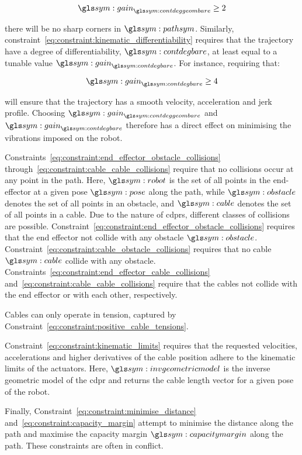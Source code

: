 	\begin{equation}
		\gain_{\contdeggeombare} \geq 2
	\end{equation}

	there will be no sharp corners in $\pathsym$. Similarly,
	constraint~\ref{eq:constraint:kinematic_differentiability} requires that the
	trajectory have a degree of differentiability, $\contdegbare$, at least
	equal to a tunable value $\gain_{\contdegbare}$. For instance, requiring
	that:

	\begin{equation}
		\gain_{\contdegbare} \geq 4
	\end{equation}

	will ensure that the trajectory has a smooth velocity, acceleration and jerk
	profile. Choosing $\gain_{\contdeggeombare}$ and $\gain_{\contdegbare}$
	therefore has a direct effect on minimising the vibrations imposed on the
	robot.

	Constraints~\ref{eq:constraint:end_effector_obstacle_collisions}
	through~\ref{eq:constraint:cable_cable_collisions} require that no
	collisions occur at any point in the path. Here, $\robot$ is the set of all
	points in the end-effector at a given pose $\pose$ along the path, while
	$\obstacle$ denotes the set of all points in an obstacle, and $\cable$
	denotes the set of all points in a cable. Due to the nature of \glspl{cdpr},
	different classes of collisions are possible.
	Constraint~\ref{eq:constraint:end_effector_obstacle_collisions} requires
	that the end effector not collide with any obstacle $\obstacle$.
	Constraint~\ref{eq:constraint:cable_obstacle_collisions} requires that no
	cable $\cable$ collide with any obstacle.
	Constraints~\ref{eq:constraint:end_effector_cable_collisions}
	and~\ref{eq:constraint:cable_cable_collisions} require that the cables not
	collide with the end effector or with each other, respectively.

	Cables can only operate in tension, captured by
	Constraint~\ref{eq:constraint:positive_cable_tensions}.

	Constraint~\ref{eq:constraint:kinematic_limits} requires that the requested
	velocities, accelerations and higher derivatives of the cable position
	adhere to the kinematic limits of the actuators. Here, $\invgeometricmodel$
	is the inverse geometric model of the \gls{cdpr} and returns the cable
	length vector for a given pose of the robot.

	Finally, Constraint~\ref{eq:constraint:minimise_distance}
	and~\ref{eq:constraint:capacity_margin} attempt to minimise the distance
	along the path and maximise the capacity margin $\capacitymargin$ along the
	path. These constraints are often in conflict.

